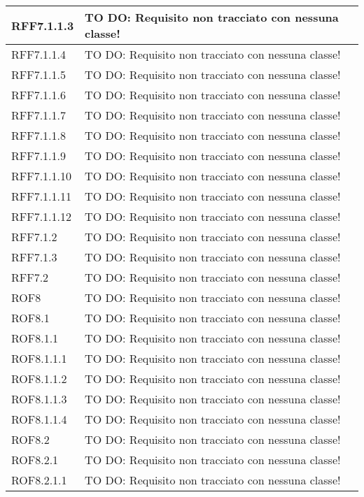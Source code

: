\begin{center}
\begin{longtable}{| p{4cm} | p{8cm} |}
\hline
RFF7.1.1.3 & TO DO: Requisito non tracciato con nessuna classe! \\
\hline
RFF7.1.1.4 & TO DO: Requisito non tracciato con nessuna classe! \\
\hline
RFF7.1.1.5 & TO DO: Requisito non tracciato con nessuna classe! \\
\hline
RFF7.1.1.6 & TO DO: Requisito non tracciato con nessuna classe! \\
\hline
RFF7.1.1.7 & TO DO: Requisito non tracciato con nessuna classe! \\
\hline
RFF7.1.1.8 & TO DO: Requisito non tracciato con nessuna classe! \\
\hline
RFF7.1.1.9 & TO DO: Requisito non tracciato con nessuna classe! \\
\hline
RFF7.1.1.10 & TO DO: Requisito non tracciato con nessuna classe! \\
\hline
RFF7.1.1.11 & TO DO: Requisito non tracciato con nessuna classe! \\
\hline
RFF7.1.1.12 & TO DO: Requisito non tracciato con nessuna classe! \\
\hline
RFF7.1.2 & TO DO: Requisito non tracciato con nessuna classe! \\
\hline
RFF7.1.3 & TO DO: Requisito non tracciato con nessuna classe! \\
\hline
RFF7.2 & TO DO: Requisito non tracciato con nessuna classe! \\
\hline
ROF8 & TO DO: Requisito non tracciato con nessuna classe! \\
\hline
ROF8.1 & TO DO: Requisito non tracciato con nessuna classe! \\
\hline
ROF8.1.1 & TO DO: Requisito non tracciato con nessuna classe! \\
\hline
ROF8.1.1.1 & TO DO: Requisito non tracciato con nessuna classe! \\
\hline
ROF8.1.1.2 & TO DO: Requisito non tracciato con nessuna classe! \\
\hline
ROF8.1.1.3 & TO DO: Requisito non tracciato con nessuna classe! \\
\hline
ROF8.1.1.4 & TO DO: Requisito non tracciato con nessuna classe! \\
\hline
ROF8.2 & TO DO: Requisito non tracciato con nessuna classe! \\
\hline
ROF8.2.1 & TO DO: Requisito non tracciato con nessuna classe! \\
\hline
ROF8.2.1.1 & TO DO: Requisito non tracciato con nessuna classe! \\
\hline

\end{longtable}
\end{center}
